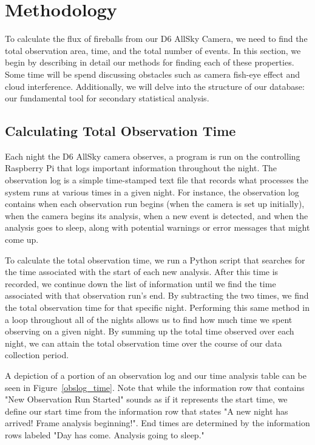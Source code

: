 

\chapter{Methodology}

To calculate the flux of fireballs from our D6 AllSky Camera, we need to find the total observation area, time, and the total number of events.
In this section, we begin by describing in detail our methods for finding each of these properties.
Some time will be spend discussing obstacles such as camera fish-eye effect and cloud interference.  
Additionally, we will delve into the structure of our database: our fundamental tool for secondary statistical analysis.

\section{Calculating Total Observation Time}

Each night the D6 AllSky camera observes, a program is run on the controlling Raspberry Pi that logs important information throughout the night.
The observation log is a simple time-stamped text file that records what processes the system runs at various times in a given night.
For instance, the observation log contains when each observation run begins (when the camera is set up initially), when the camera begins its analysis, when a new event is detected, and when the analysis goes to sleep, along with potential warnings or error messages that might come up.

To calculate the total observation time, we run a Python script that searches for the time associated with the start of each new analysis.  
After this time is recorded, we continue down the list of information until we find the time associated with that observation run's end.  
By subtracting the two times, we find the total observation time for that specific night.  
Performing this same method in a loop throughout all of the nights allows us to find how much time we spent observing on a given night. 
By summing up the total time observed over each night, we can attain the total observation time over the course of our data collection period.

A depiction of a portion of an observation log and our time analysis table can be seen in Figure~\ref{obslog_time}.
Note that while the information row that contains "New Observation Run Started" sounds as if it represents the start time, we define our start time from the information row that states "A new night has arrived! Frame analysis beginning!".
End times are determined by the information rows labeled "Day has come.  Analysis going to sleep."

